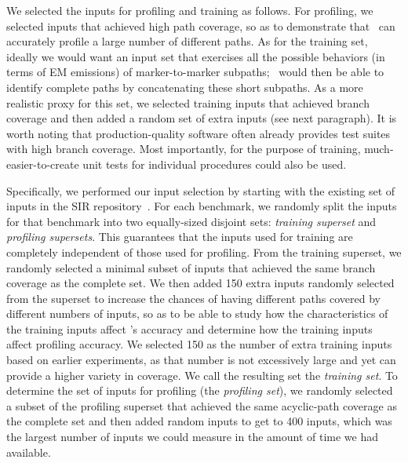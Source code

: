 We selected the inputs for profiling and training as follows. For profiling, we selected inputs that achieved high path coverage, so as to demonstrate that \zop\ can accurately profile a large number of different paths. As for the training set, ideally we would want an input set that exercises all the possible behaviors (in terms of EM emissions) of marker-to-marker subpaths; \zop\ would then be able to identify complete paths by concatenating these short subpaths. As a more realistic proxy for this set, we selected training inputs that achieved branch coverage and then added a random set of extra inputs (see next paragraph). It is worth noting that production-quality software often already provides test suites with high branch coverage.  Most importantly, for the purpose of training, much-easier-to-create unit tests for individual procedures could also be used.

Specifically, we performed our input selection by starting with the existing set of inputs in the SIR repository~\cite{Software-artifact}.  For each benchmark, we randomly split the inputs for that benchmark into two equally-sized disjoint sets: \textit{training superset} and \textit{profiling supersets}. This guarantees that the inputs used for training are completely independent of those used for profiling. From the training superset, we randomly selected a minimal subset of inputs that achieved the same branch coverage as the complete set. We then added 150 extra inputs randomly selected from the superset to increase the chances of having different paths covered by different numbers of inputs, so as to be able to study how the characteristics of the training inputs affect \zop's accuracy and determine how the training inputs affect profiling accuracy. We selected 150 as the number of extra training inputs based on earlier experiments, as that number is not excessively large and yet can provide a higher variety in coverage. We call the resulting set the \textit{training set}. To determine the set of inputs for profiling (\ie the \textit{profiling set}), we randomly selected a subset of the profiling superset that achieved the same acyclic-path coverage as the complete set and then added random inputs to get to 400 inputs, which was the largest number of inputs we could measure in the amount of time we had available.

